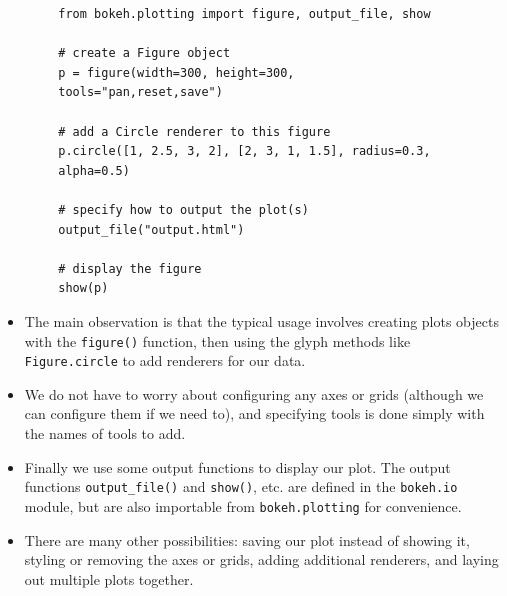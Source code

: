 \documentclass[a4paper,12pt]{article}
\begin{document}
{
	\large
	\begin{framed}
		\begin{verbatim}
		from bokeh.plotting import figure, output_file, show
		
		# create a Figure object
		p = figure(width=300, height=300,  
		tools="pan,reset,save")
		
		# add a Circle renderer to this figure
		p.circle([1, 2.5, 3, 2], [2, 3, 1, 1.5], radius=0.3,
		alpha=0.5)
		
		# specify how to output the plot(s)
		output_file("output.html")
		
		# display the figure
		show(p)
		\end{verbatim}
	\end{framed}
}
\newpage
\begin{itemize}
	\item The main observation is that the typical usage involves creating plots objects with the \texttt{figure()} function, then using the glyph methods like \texttt{Figure.circle} to add renderers for our data. 
	\item We do not have to worry about configuring any axes or grids (although we can configure them if we need to), and specifying tools is done simply with the names of tools to add. 
	
	
	\item Finally we use some output functions to display our plot. The output functions \texttt{output\_file()} and \texttt{show()}, etc. are defined in the \texttt{bokeh.io} module, but are also importable from \texttt{bokeh.plotting} for convenience.
	
	
	\item There are many other possibilities: saving our plot instead of showing it, styling or removing the axes or grids, adding additional renderers, and laying out multiple plots together.
\end{itemize}



\newpage
\end{document}
